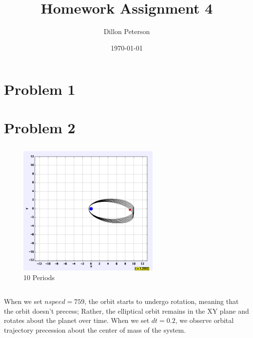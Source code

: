 \documentclass[pra,superscriptaddress,reprint,showpacs]{revtex4-1}
\begin{document}
\title{Homework Assignment 4}
\date{\today}
\author{Dillon Peterson}

\maketitle

\section{Problem 1}
\begin{center}
\checkmark
\end{center}

\section{Problem 2}
\subsection{}
\begin{figure}[h!]
    \centering
    \caption{10 Periods}
    \includegraphics[width=7cm]{2aa.png}
\end{figure}

\subsection{}
When we set $nspeed=759$, the orbit starts to undergo rotation, meaning that the orbit doesn't precess; Rather, the elliptical orbit remains in the XY plane and rotates about the planet over time. When we set $dt=0.2$, we observe orbital trajectory precession about the center of mass of the system. 
\end{document}

